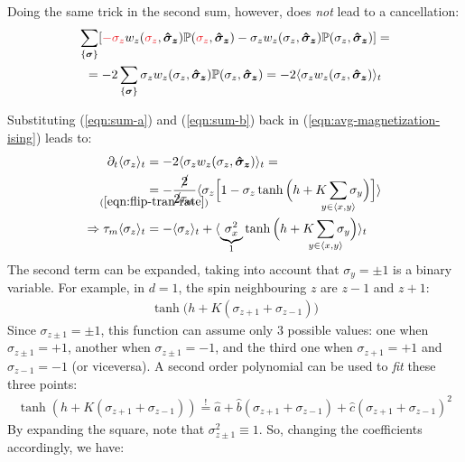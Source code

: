 \documentclass[../../main.tex]{subfiles}
\begin{document}
Doing the same trick in the second sum, however, does \textit{not} lead to a cancellation:
\begin{align} \nonumber
    \sum_{\{\bm{\sigma}\}} [\textcolor{Red}{-\sigma_z} w_z(\textcolor{Red}{\sigma_z}, \bm{\hat{\sigma}_z}) \mathbb{P}(\textcolor{Red}{\sigma_z}, \bm{\hat{\sigma}_z}) - \sigma_z w_z(\sigma_z, \bm{\hat{\sigma}_z}) \mathbb{P}(\sigma_z, \bm{\hat{\sigma}_z})] = \span \\
    = -2 \sum_{\{\bm{\sigma}\}} \sigma_z w_z(\sigma_z, \bm{\hat{\sigma}_z}) \mathbb{P}(\sigma_z, \bm{\hat{\sigma}_z}) = -2 \langle \sigma_z w_z(\sigma_z, \bm{\hat{\sigma}_z}) \rangle_t \span \label{eqn:sum-b}
\end{align}

Substituting (\ref{eqn:sum-a}) and (\ref{eqn:sum-b}) back in (\ref{eqn:avg-magnetization-ising}) leads to:
\begin{align} \nonumber
    \partial_t \langle \sigma_z \rangle_t &= -2 \langle \sigma_z w_z(\sigma_z, \bm{\hat{\sigma}_z}) \rangle_t =\\ \nonumber
    &\underset{\mathclap{(\ref{eqn:flip-tran-rate})}}{=}  -\frac{\cancel{2}}{\cancel{2} \tau_m} \langle \sigma_z \Big[1 - \sigma_z \tanh\Big(h + K \sum_{\mathclap{y \in \langle x,y \rangle}} \sigma_y \Big)\Big] \rangle\\
    \Rightarrow \tau_m \langle \sigma_z \rangle_t &= -\langle \sigma_z \rangle_t + \langle \underbrace{\sigma_x^2}_{1}  \tanh \Big(h + K \sum_{\mathclap{y \in \langle x,y \rangle}} \sigma_y\Big) \rangle_t \label{eqn:avg-mag-z}
\end{align}
The second term can be expanded, taking into account that $\sigma_y = \pm 1$ is a binary variable. For example, in $d=1$, the spin neighbouring $z$ are $z-1$ and $z+1$:
\begin{align*}
    \tanh\Big(h + K(\sigma_{z+1} + \sigma_{z-1})\Big)
\end{align*}
Since $\sigma_{z\pm 1} = \pm 1$, this function can assume only $3$ possible values: one when $\sigma_{z\pm1} = +1$, another when $\sigma_{z \pm 1} = -1$, and the third one when $\sigma_{z+1} = +1$ and $\sigma_{z-1} = -1$ (or viceversa). A second order polynomial can be used to \textit{fit} these three points:
\begin{align*}
    \tanh(h + K(\sigma_{z+1} + \sigma_{z-1})) \overset{!}{=}  \hat{a} + \hat{b} (\sigma_{z+1} + \sigma_{z-1}) + \hat{c} (\sigma_{z+1} + \sigma_{z-1})^2
\end{align*} 
By expanding the square, note that $\sigma_{z \pm 1}^2 \equiv 1$. So, changing the coefficients accordingly, we have:
\end{document}
